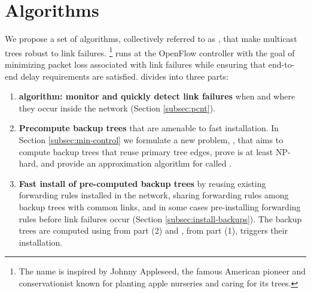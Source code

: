 \section{Algorithms}
\label{sec:algs}

We propose a set of algorithms, collectively referred to as \mdrs, that make multicast trees robust to link failures.  
\footnote{The name \mdr is inspired by Johnny Appleseed, the famous American pioneer and conservationist known for planting apple nurseries and caring for its trees. }
\mdr runs at the OpenFlow controller with the goal of minimizing packet loss associated with link failures while ensuring that end-to-end delay requirements are satisfied.
\mdr divides into three parts: %
\begin{enumerate}
	\item {\bf \pcnt algorithm: monitor and quickly detect link failures} when and where they occur inside the network (Section \ref{subsec:pcnt}).
	
	\item {\bf Precompute backup trees} that are amenable to fast installation.  In Section \ref{subsec:min-control} we formulate a new problem, \mcs, that aims to compute backup trees that
	reuse primary tree edges, prove \mc is at least NP-hard, and provide an approximation algorithm for \mc called \steiners.

	\item {\bf Fast install of pre-computed backup trees} by reusing existing forwarding rules installed in the network, sharing forwarding rules among backup trees with common links, and
	in some cases pre-installing forwarding rules before link failures occur (Section \ref{subsec:install-backups}).  The backup trees are computed using \steiner from part (2) and \pcnts, from
	part (1), triggers their installation.

	
\end{enumerate}


